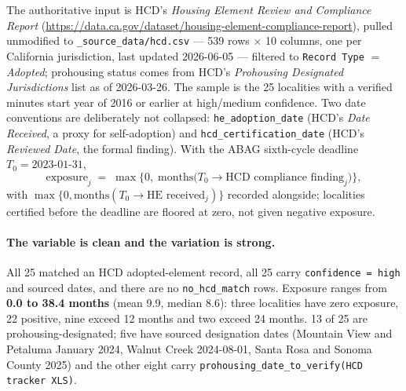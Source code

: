 \documentclass[11pt]{article}
\begin{document}
The authoritative input is HCD's \emph{Housing Element Review and Compliance Report}
(\url{https://data.ca.gov/dataset/housing-element-compliance-report}), pulled unmodified to
\texttt{\_source\_data/hcd.csv} --- 539 rows $\times$ 10 columns, one per California jurisdiction,
last updated 2026-06-05 --- filtered to \texttt{Record Type} $=$ \emph{Adopted}; prohousing status
comes from HCD's \emph{Prohousing Designated Jurisdictions} list as of 2026-03-26. The sample is
the 25 localities with a verified minutes start year of 2016 or earlier at high/medium confidence.
Two date conventions are deliberately not collapsed: \texttt{he\_adoption\_date} (HCD's \emph{Date
Received}, a proxy for self-adoption) and \texttt{hcd\_certification\_date} (HCD's \emph{Reviewed
Date}, the formal finding). With the ABAG sixth-cycle deadline $T_0 = \text{2023-01-31}$,
\[
  \text{exposure}_j \;=\; \max\!\big\{0,\; \text{months}\big(T_0 \rightarrow
  \text{HCD compliance finding}_j\big)\big\},
\]
with $\max\{0, \text{months}(T_0 \rightarrow \text{HE received}_j)\}$ recorded alongside;
localities certified before the deadline are floored at zero, not given negative exposure.

\paragraph{The variable is clean and the variation is strong.} All 25 matched an HCD
adopted-element record, all 25 carry \texttt{confidence = high} and sourced dates, and there are
no \texttt{no\_hcd\_match} rows. Exposure ranges from \textbf{0.0 to 38.4 months} (mean 9.9,
median 8.6): three localities have zero exposure, 22 positive, nine exceed 12 months and two
exceed 24 months. 13 of 25 are prohousing-designated; five have sourced designation dates
(Mountain View and Petaluma January 2024, Walnut Creek 2024-08-01, Santa Rosa and Sonoma County
2025) and the other eight carry \texttt{prohousing\_date\_to\_verify(HCD tracker XLS)}.
\end{document}
